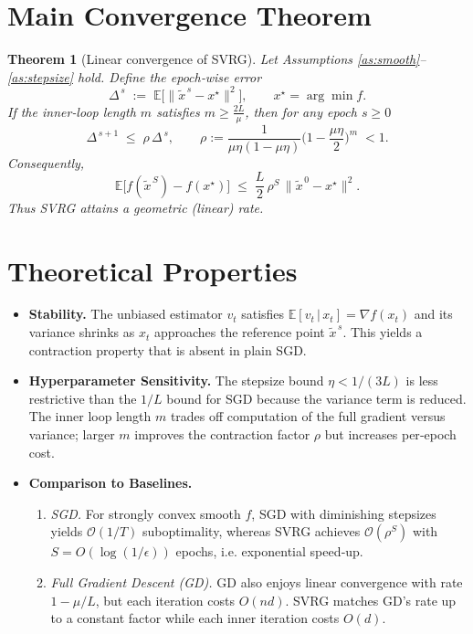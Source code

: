 \documentclass[11pt]{article}
\newtheorem{theorem}{Theorem}
\newcommand{\E}{\mathbb{E}}
\begin{document}
\section*{Main Convergence Theorem}
\begin{theorem}[Linear convergence of SVRG]\label{thm:linear}
Let Assumptions \ref{as:smooth}–\ref{as:stepsize} hold. Define the epoch‑wise error 
\[
\Delta^{\,s}\;:=\;\E\!\big[\| \tilde{x}^{\,s}-x^{\star}\|^{2}\big],
\qquad x^{\star}= \arg\min f .
\]
If the inner‑loop length $m$ satisfies $m\ge \frac{2L}{\mu}$, then for any epoch $s\ge0$
\[
\Delta^{\,s+1}\;\le\;\rho\,\Delta^{\,s},\qquad 
\rho:=\frac{1}{\mu\eta(1-\mu\eta)}\Big(1-\frac{\mu\eta}{2}\Big)^{m}\;<1 .
\]
Consequently,
\[
\E\!\big[f(\tilde{x}^{\,S})-f(x^{\star})\big]\;\le\;\frac{L}{2}\,\rho^{S}\,\| \tilde{x}^{\,0}-x^{\star}\|^{2}.
\]
Thus SVRG attains a \emph{geometric} (linear) rate.
\end{theorem}

\section*{Theoretical Properties}
\begin{itemize}
\item \textbf{Stability.} The unbiased estimator $v_t$ satisfies $\E[v_t\,|\,x_t]=\nabla f(x_t)$ and its variance shrinks as $x_t$ approaches the reference point $\tilde{x}^{\,s}$. This yields a contraction property that is absent in plain SGD.
\item \textbf{Hyperparameter Sensitivity.} The stepsize bound $\eta<1/(3L)$ is less restrictive than the $1/L$ bound for SGD because the variance term is reduced. The inner loop length $m$ trades off computation of the full gradient versus variance; larger $m$ improves the contraction factor $\rho$ but increases per‑epoch cost.
\item \textbf{Comparison to Baselines.}
    \begin{enumerate}
        \item \emph{SGD.} For strongly convex smooth $f$, SGD with diminishing stepsizes yields $\mathcal{O}(1/T)$ suboptimality, whereas SVRG achieves $\mathcal{O}(\rho^{S})$ with $S=O(\log(1/\epsilon))$ epochs, i.e. exponential speed‑up.
        \item \emph{Full Gradient Descent (GD).} GD also enjoys linear convergence with rate $1-\mu/L$, but each iteration costs $O(nd)$. SVRG matches GD’s rate up to a constant factor while each inner iteration costs $O(d)$.
    \end{enumerate}
\end{itemize}
\end{document}

